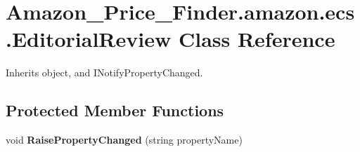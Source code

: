 \hypertarget{class_amazon___price___finder_1_1amazon_1_1ecs_1_1_editorial_review}{\section{Amazon\-\_\-\-Price\-\_\-\-Finder.\-amazon.\-ecs.\-Editorial\-Review Class Reference}
\label{class_amazon___price___finder_1_1amazon_1_1ecs_1_1_editorial_review}
}


 




Inherits object, and I\-Notify\-Property\-Changed.

\subsection*{Protected Member Functions}
\begin{DoxyCompactItemize}
\item 
\hypertarget{class_amazon___price___finder_1_1amazon_1_1ecs_1_1_editorial_review_a13947f46e465c02e69479a9630b9ec59}{void {\bfseries Raise\-Property\-Changed} (string property\-Name)}\label{class_amazon___price___finder_1_1amazon_1_1ecs_1_1_editorial_review_a13947f46e465c02e69479a9630b9ec59}

\end{DoxyCompactItemize}
